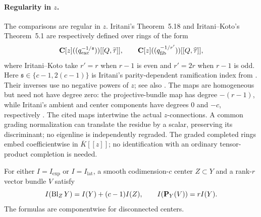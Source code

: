 \paragraph{Regularity in \(z\).}
The comparisons are regular in \(z\).  Iritani's Theorem~5.18 and
Iritani--Koto's Theorem~5.1 are respectively defined over rings of the form
\[
 \mathbf C[z]((q_{\mathrm{exc}}^{-1/\mathfrak s}))[[Q,\widetilde\tau]],
 \qquad
 \mathbf C[z]((q_{\mathrm{fib}}^{-1/r'}))[[Q,\widehat\tau]],
\]
where Iritani--Koto take \(r'=r\) when \(r-1\) is even and \(r'=2r\) when
\(r-1\) is odd.  Here \(\mathfrak s\in\{c-1,2(c-1)\}\) is Iritani's
parity-dependent ramification index from \cite[(5.11)]{IritaniBlowup}.  Their
inverses use no negative powers of \(z\); see also
\cite[Remark~5.3]{IritaniKoto}.  The maps are homogeneous but need not have
degree zero: the projective-bundle map has degree \(-(r-1)\), while Iritani's
ambient and center components have degrees \(0\) and \(-c\), respectively
\cite[Theorem~5.1(3)]{IritaniKoto}\cite[Theorem~5.18(3)]{IritaniBlowup}.
The cited maps intertwine the actual \(z\)-connections.  A common grading
normalization can translate the residue by a scalar, preserving its
discriminant; no eigenline is independently regraded.  The graded completed rings embed coefficientwise
in \(\overline K[[z]]\); no identification with an ordinary tensor-product
completion is needed.

\begin{proposition}
\label{prop:intrinsic-count-formulas}
%
%
%
For either \(I=I_{\mathrm{exp}}\) or \(I=I_{\mathrm{lat}}\), a smooth
codimension-\(c\) center \(Z\subset Y\) and a rank-\(r\) vector bundle \(V\)
satisfy
\begin{equation}
 I(\operatorname{Bl}_ZY)=I(Y)+(c-1)I(Z),\qquad
 I(\mathbf P_Y(V))=rI(Y).
 \label{eq:intrinsic-count-formulas}
\end{equation}
The formulas are componentwise for disconnected centers.
\end{proposition}

